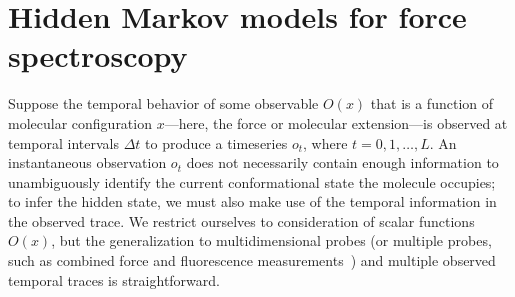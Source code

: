 \documentclass[aps,pre,twocolumn,superscriptaddress,nofootinbib,longbibliography]{revtex4-1}
\begin{document}
{\section{Hidden Markov models for force spectroscopy}
\label{section:theory}

Suppose the temporal behavior of some observable $O(x)$ that is a function of molecular configuration $x$---here, the force or molecular extension---is observed at temporal intervals $\Delta t$ to produce a timeseries $o_t$, where $t = 0, 1, \ldots, L$.
An instantaneous observation $o_t$ does not necessarily contain enough information to unambiguously identify the current conformational state the molecule occupies; to infer the hidden state, we must also make use of the temporal information in the observed trace.
We restrict ourselves to consideration of scalar functions $O(x)$, but the generalization to multidimensional probes (or multiple probes, such as combined force and fluorescence measurements~\cite{chemla:nature-methods:2011:fluorescence-force}) and multiple observed temporal traces is straightforward.

}
\end{document}
